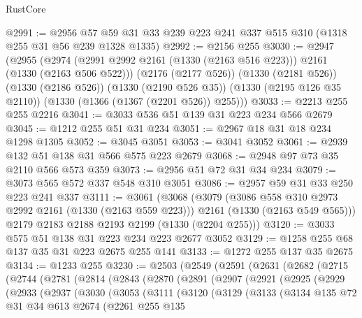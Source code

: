 \begin{lexlean}{RustCore}
\begin{coremodule}
@2991 := @2956 @57 @59 @31 @33 @239 @223 @241 @337 @515 @310 (@1318 @255 @31 @56 @239 @1328 @1335)
@2992 := @2156 @255
@3030 := @2947
    (@2955
      (@2974 (@2991 @2992 @2161 (@1330 (@2163 @516 @223))) @2161 (@1330 (@2163 @506 @522)))
      (@2176 (@2177 @526))
      (@1330 (@2181 @526))
      (@1330 (@2186 @526))
      (@1330 (@2190 @526 @35))
      (@1330 (@2195 @126 @35 @2110))
      (@1330 (@1366 (@1367 (@2201 @526)) @255)))
@3033 := @2213 @255 @255 @2216
@3041 := @3033 @536 @51 @139 @31 @223 @234 @566 @2679
@3045 := @1212 @255 @51 @31 @234
@3051 := @2967 @18 @31 @18 @234 @1298 @1305
@3052 := @3045 @3051
@3053 := @3041 @3052
@3061 := @2939 @132 @51 @138 @31 @566 @575 @223 @2679
@3068 := @2948 @97 @73 @35 @2110 @566 @573 @359
@3073 := @2956 @51 @72 @31 @34 @234
@3079 := @3073 @565 @572 @337 @548 @310 @3051
@3086 := @2957 @59 @31 @33 @250 @223 @241 @337
@3111 := @3061
    (@3068
      (@3079
        (@3086 @558 @310 @2973 @2992 @2161 (@1330 (@2163 @559 @223)))
        @2161
        (@1330 (@2163 @549 @565)))
      @2179
      @2183
      @2188
      @2193
      @2199
      (@1330 (@2204 @255)))
@3120 := @3033 @575 @51 @138 @31 @223 @234 @223 @2677 @3052
@3129 := @1258 @255 @68 @137 @35 @31 @223 @2675 @255 @141
@3133 := @1272 @255 @137 @35 @2675
@3134 := @1233 @255
@3230 := @2503
    (@2549
      (@2591
        (@2631
          (@2682
            (@2715
              (@2744
                (@2781
                  (@2814
                    (@2843
                      (@2870
                        (@2891
                          (@2907
                            (@2921
                              (@2925
                                (@2929
                                  (@2933
                                    (@2937
                                      (@3030
                                        (@3053
                                          (@3111
                                            (@3120
                                              (@3129
                                                (@3133
                                                  (@3134
                                                    @135
                                                    @72
                                                    @31
                                                    @34
                                                    @613
                                                    @2674
                                                    (@2261
                                                      @255
                                                      @135

\end{coremodule}
\end{lexlean}
